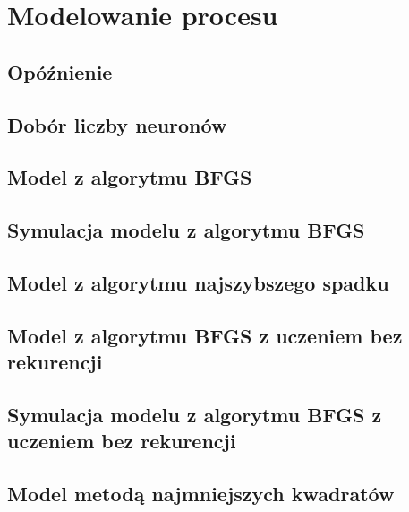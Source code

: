 \chapter{Modelowanie procesu}
	\label{ch:mod}
	
	\section{Opóźnienie}
		\label{sec:tau}
	
	\section{Dobór liczby neuronów}
		\label{sec:neurony}
		
	\section{Model z algorytmu BFGS}
		\label{sec:bfgs}
		
	\section{Symulacja modelu z algorytmu BFGS}
		\label{sec:bfgs_sym}
		
	\section{Model z algorytmu najszybszego spadku}
		\label{sec:naj_sp}
		
	\section{Model z algorytmu BFGS z uczeniem bez rekurencji}
		\label{sec:bfgs_arx}
		
	\section{Symulacja modelu z algorytmu BFGS z uczeniem bez rekurencji}
		\label{sec:bfgs_arx_sym}
		
	\section{Model metodą najmniejszych kwadratów}
		\label{sec:mnk}